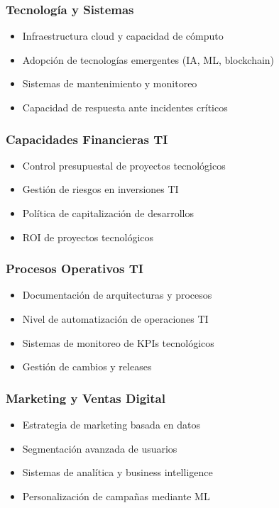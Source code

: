 \subsubsection{Tecnología y Sistemas}
\begin{itemize}
\item Infraestructura cloud y capacidad de cómputo
\item Adopción de tecnologías emergentes (IA, ML, blockchain)
\item Sistemas de mantenimiento y monitoreo
\item Capacidad de respuesta ante incidentes críticos
\end{itemize}

\subsubsection{Capacidades Financieras TI}
\begin{itemize}
\item Control presupuestal de proyectos tecnológicos
\item Gestión de riesgos en inversiones TI
\item Política de capitalización de desarrollos
\item ROI de proyectos tecnológicos
\end{itemize}

\subsubsection{Procesos Operativos TI}
\begin{itemize}
\item Documentación de arquitecturas y procesos
\item Nivel de automatización de operaciones TI
\item Sistemas de monitoreo de KPIs tecnológicos
\item Gestión de cambios y releases
\end{itemize}

\subsubsection{Marketing y Ventas Digital}
\begin{itemize}
\item Estrategia de marketing basada en datos
\item Segmentación avanzada de usuarios
\item Sistemas de analítica y business intelligence
\item Personalización de campañas mediante ML
\end{itemize}

